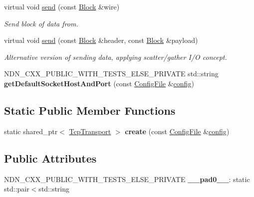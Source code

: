 \begin{DoxyCompactItemize}
\item 
virtual void \hyperlink{classndn_1_1TcpTransport_a0df4d53a96c59f51114e4edfafda1230}{send} (const \hyperlink{classndn_1_1Block}{Block} \&wire)
\begin{DoxyCompactList}\small\item\em Send block of data from. \end{DoxyCompactList}\item 
virtual void \hyperlink{classndn_1_1TcpTransport_ae2143d6783befe974adbc0372fcc6849}{send} (const \hyperlink{classndn_1_1Block}{Block} \&header, const \hyperlink{classndn_1_1Block}{Block} \&payload)
\begin{DoxyCompactList}\small\item\em Alternative version of sending data, applying scatter/gather I/O concept. \end{DoxyCompactList}\item 
N\+D\+N\+\_\+\+C\+X\+X\+\_\+\+P\+U\+B\+L\+I\+C\+\_\+\+W\+I\+T\+H\+\_\+\+T\+E\+S\+T\+S\+\_\+\+E\+L\+S\+E\+\_\+\+P\+R\+I\+V\+A\+TE std\+::string {\bfseries get\+Default\+Socket\+Host\+And\+Port} (const \hyperlink{classndn_1_1ConfigFile}{Config\+File} \&\hyperlink{classconfig}{config})\hypertarget{classndn_1_1TcpTransport_a079c75bb67bb406ec5a0deaaa1919c33}{}\label{classndn_1_1TcpTransport_a079c75bb67bb406ec5a0deaaa1919c33}

\end{DoxyCompactItemize}
\subsection*{Static Public Member Functions}
\begin{DoxyCompactItemize}
\item 
static shared\+\_\+ptr$<$ \hyperlink{classndn_1_1TcpTransport}{Tcp\+Transport} $>$ {\bfseries create} (const \hyperlink{classndn_1_1ConfigFile}{Config\+File} \&\hyperlink{classconfig}{config})\hypertarget{classndn_1_1TcpTransport_a529cd5f8106370fd0b7af8cda2b4e347}{}\label{classndn_1_1TcpTransport_a529cd5f8106370fd0b7af8cda2b4e347}

\end{DoxyCompactItemize}
\subsection*{Public Attributes}
\begin{DoxyCompactItemize}
\item 
N\+D\+N\+\_\+\+C\+X\+X\+\_\+\+P\+U\+B\+L\+I\+C\+\_\+\+W\+I\+T\+H\+\_\+\+T\+E\+S\+T\+S\+\_\+\+E\+L\+S\+E\+\_\+\+P\+R\+I\+V\+A\+TE {\bfseries \+\_\+\+\_\+pad0\+\_\+\+\_\+}\+: static std\+::pair$<$std\+::string\hypertarget{classndn_1_1TcpTransport_ac879855f81db3819c5e34243b5e506bd}{}\label{classndn_1_1TcpTransport_ac879855f81db3819c5e34243b5e506bd}

\end{DoxyCompactItemize}
